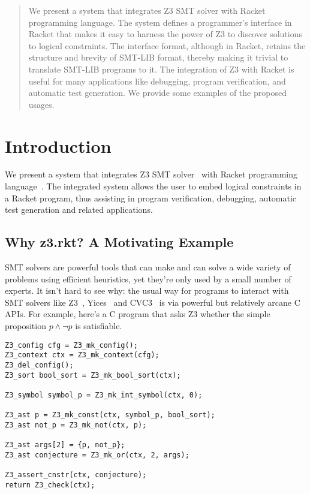 \begin{abstract}
 We present a system that integrates Z3 SMT solver with
 Racket programming language. The system defines a programmer's
 interface in Racket that makes it easy to harness the power
 of Z3 to discover solutions to logical constraints. The
 interface format, although in Racket, retains the structure
 and brevity of SMT-LIB format, thereby making it trivial to
 translate SMT-LIB programs to it. The integration of Z3
 with Racket is useful for many applications like debugging,
 program verification, and automatic test generation. We
 provide some examples of the proposed usages.
\end{abstract}
\section{Introduction}
We present a system that integrates Z3 SMT solver~\cite{z3} with
Racket programming language~\cite{racket}. The integrated
system allows the user to embed logical constraints in a
Racket program, thus assisting in program verification,
debugging, automatic test generation and related
applications.

\subsection{Why z3.rkt? A Motivating Example}

SMT solvers are powerful tools that can make and can solve a wide variety of
problems using efficient heuristics, yet they're only used by a small number of
experts. It isn't hard to see why: the usual way for programs to interact with
SMT solvers like Z3~\cite{z3}, Yices~\cite{yices} and CVC3~\cite{cvc3} is via
powerful but relatively arcane C APIs. For example, here's a C program that asks
Z3 whether the simple proposition $p \wedge \neg p$ is satisfiable.

\begin{verbatim}
Z3_config cfg = Z3_mk_config();
Z3_context ctx = Z3_mk_context(cfg);
Z3_del_config();
Z3_sort bool_sort = Z3_mk_bool_sort(ctx);

Z3_symbol symbol_p = Z3_mk_int_symbol(ctx, 0);

Z3_ast p = Z3_mk_const(ctx, symbol_p, bool_sort);
Z3_ast not_p = Z3_mk_not(ctx, p);

Z3_ast args[2] = {p, not_p};
Z3_ast conjecture = Z3_mk_or(ctx, 2, args);

Z3_assert_cnstr(ctx, conjecture);
return Z3_check(ctx);
\end{verbatim}

